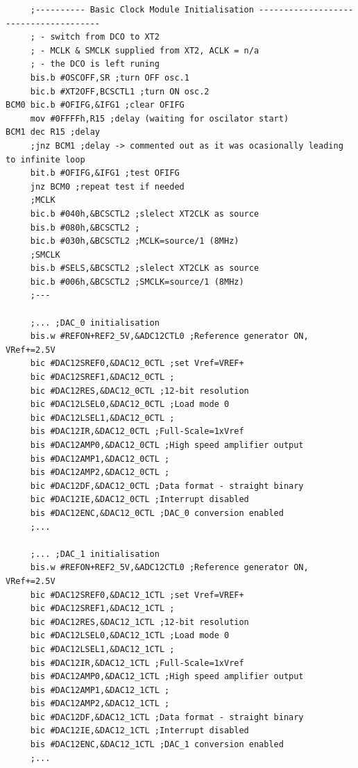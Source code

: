 \documentclass{article}
\begin{document}
\begin{verbatim}
     ;---------- Basic Clock Module Initialisation --------------------------------------
     ; - switch from DCO to XT2
     ; - MCLK & SMCLK supplied from XT2, ACLK = n/a
     ; - the DCO is left runing
     bis.b #OSCOFF,SR ;turn OFF osc.1
     bic.b #XT2OFF,BCSCTL1 ;turn ON osc.2
BCM0 bic.b #OFIFG,&IFG1 ;clear OFIFG
     mov #0FFFFh,R15 ;delay (waiting for oscilator start)
BCM1 dec R15 ;delay
     ;jnz BCM1 ;delay -> commented out as it was ocasionally leading to infinite loop
     bit.b #OFIFG,&IFG1 ;test OFIFG
     jnz BCM0 ;repeat test if needed
     ;MCLK
     bic.b #040h,&BCSCTL2 ;slelect XT2CLK as source
     bis.b #080h,&BCSCTL2 ;
     bic.b #030h,&BCSCTL2 ;MCLK=source/1 (8MHz)
     ;SMCLK
     bis.b #SELS,&BCSCTL2 ;slelect XT2CLK as source
     bic.b #006h,&BCSCTL2 ;SMCLK=source/1 (8MHz)
     ;---

     ;... ;DAC_0 initialisation 
     bis.w #REFON+REF2_5V,&ADC12CTL0 ;Reference generator ON, VRef+=2.5V
     bic #DAC12SREF0,&DAC12_0CTL ;set Vref=VREF+
     bic #DAC12SREF1,&DAC12_0CTL ;
     bic #DAC12RES,&DAC12_0CTL ;12-bit resolution
     bic #DAC12LSEL0,&DAC12_0CTL ;Load mode 0
     bic #DAC12LSEL1,&DAC12_0CTL ;
     bis #DAC12IR,&DAC12_0CTL ;Full-Scale=1xVref
     bis #DAC12AMP0,&DAC12_0CTL ;High speed amplifier output 
     bis #DAC12AMP1,&DAC12_0CTL ; 
     bis #DAC12AMP2,&DAC12_0CTL ;
     bic #DAC12DF,&DAC12_0CTL ;Data format - straight binary 
     bic #DAC12IE,&DAC12_0CTL ;Interrupt disabled 
     bis #DAC12ENC,&DAC12_0CTL ;DAC_0 conversion enabled 
     ;...

     ;... ;DAC_1 initialisation 
     bis.w #REFON+REF2_5V,&ADC12CTL0 ;Reference generator ON, VRef+=2.5V
     bic #DAC12SREF0,&DAC12_1CTL ;set Vref=VREF+
     bic #DAC12SREF1,&DAC12_1CTL ;
     bic #DAC12RES,&DAC12_1CTL ;12-bit resolution
     bic #DAC12LSEL0,&DAC12_1CTL ;Load mode 0
     bic #DAC12LSEL1,&DAC12_1CTL ;
     bis #DAC12IR,&DAC12_1CTL ;Full-Scale=1xVref
     bis #DAC12AMP0,&DAC12_1CTL ;High speed amplifier output 
     bis #DAC12AMP1,&DAC12_1CTL ; 
     bis #DAC12AMP2,&DAC12_1CTL ;
     bic #DAC12DF,&DAC12_1CTL ;Data format - straight binary 
     bic #DAC12IE,&DAC12_1CTL ;Interrupt disabled 
     bis #DAC12ENC,&DAC12_1CTL ;DAC_1 conversion enabled 
     ;... \end{verbatim}
\end{document}
